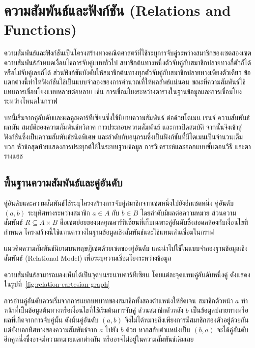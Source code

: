 \chapter{ความสัมพันธ์และฟังก์ชัน (Relations and Functions)}
\label{ch:relations}

ความสัมพันธ์และฟังก์ชันเป็นโครงสร้างทางคณิตศาสตร์ที่ใช้ระบุการจับคู่ระหว่างสมาชิกของเซตสองเซต ความสัมพันธ์กำหนดเงื่อนไขการจับคู่แบบทั่วไป สมาชิกต้นทางหนึ่งตัวจับคู่กับสมาชิกปลายทางกี่ตัวก็ได้ หรือไม่จับคู่เลยก็ได้ ส่วนฟังก์ชันบังคับให้สมาชิกต้นทางทุกตัวจับคู่กับสมาชิกปลายทางเพียงตัวเดียว ข้อแตกต่างนี้ทำให้ฟังก์ชันใช้เป็นแบบจำลองของการคำนวณที่ให้ผลลัพธ์แน่นอน ขณะที่ความสัมพันธ์ใช้แทนการเชื่อมโยงแบบหลายต่อหลาย เช่น การเชื่อมโยงระหว่างตารางในฐานข้อมูลและการเชื่อมโยงระหว่างโหนดในกราฟ

บทนี้เริ่มจากคู่อันดับและผลคูณคาร์ทีเซียนซึ่งใช้นิยามความสัมพันธ์ ต่อด้วยโดเมน เรนจ์ ความสัมพันธ์ผกผัน สมบัติของความสัมพันธ์ทวิภาค การประกอบความสัมพันธ์ และการปิดสมบัติ จากนั้นจึงเข้าสู่ฟังก์ชันซึ่งเป็นความสัมพันธ์ชนิดพิเศษ และลำดับกับอนุกรมซึ่งเป็นฟังก์ชันที่มีโดเมนเป็นจำนวนเต็มบวก หัวข้อสุดท้ายแสดงการประยุกต์ใช้ในระบบฐานข้อมูล การวิเคราะห์และออกแบบขั้นตอนวิธี และตารางแฮช

\section{พื้นฐานความสัมพันธ์และคู่อันดับ}
\label{sec:basic-relation}

คู่อันดับและความสัมพันธ์ใช้ระบุโครงสร้างการจับคู่สมาชิกจากเซตหนึ่งไปยังอีกเซตหนึ่ง คู่อันดับ $(a,b)$ ระบุทิศทางระหว่างสมาชิก $a \in A$ กับ $b \in B$ โดยลำดับมีผลต่อความหมาย ส่วนความสัมพันธ์ $R \subseteq A \times B$ คือเซตย่อยของผลคูณคาร์ทีเซียนที่เก็บเฉพาะคู่อันดับซึ่งสอดคล้องกับเงื่อนไขที่กำหนด โครงสร้างนี้ใช้แทนตารางในฐานข้อมูลเชิงสัมพันธ์และใช้แทนเส้นเชื่อมในกราฟ~\parencite{rosen2019discrete}

แนวคิดความสัมพันธ์นิยามบนทฤษฎีเซตด้วยเซตของคู่อันดับ และนำไปใช้ในแบบจำลองฐานข้อมูลเชิงสัมพันธ์ (Relational Model) เพื่อระบุความเชื่อมโยงระหว่างข้อมูล~\parencite{rosen2019discrete,codd1970relational}

ความสัมพันธ์สามารถมองเห็นได้เป็นจุดบนระนาบคาร์ทีเซียน โดยแต่ละจุดแทนคู่อันดับหนึ่งคู่ ดังแสดงในรูปที่~\ref{fig:relation-cartesian-graph}

การอ่านคู่อันดับควรเริ่มจากการแยกบทบาทของสมาชิกทั้งสองตำแหน่งให้ชัดเจน สมาชิกตัวหน้า $a$ ทำหน้าที่เป็นข้อมูลต้นทางหรือเงื่อนไขที่ใช้เริ่มต้นการจับคู่ ส่วนสมาชิกตัวหลัง $b$ เป็นข้อมูลปลายทางหรือผลที่เกิดจากการจับคู่นั้น ดังนั้นคู่อันดับ $(a,b)$ จึงไม่ได้หมายถึงเพียงการมีสมาชิกสองตัวอยู่ด้วยกัน แต่ยังบอกทิศทางของความสัมพันธ์จาก $a$ ไปยัง $b$ ด้วย หากสลับตำแหน่งเป็น $(b,a)$ จะได้คู่อันดับอีกคู่หนึ่งซึ่งอาจมีความหมายแตกต่างกัน หรืออาจไม่อยู่ในความสัมพันธ์เดิมเลย

